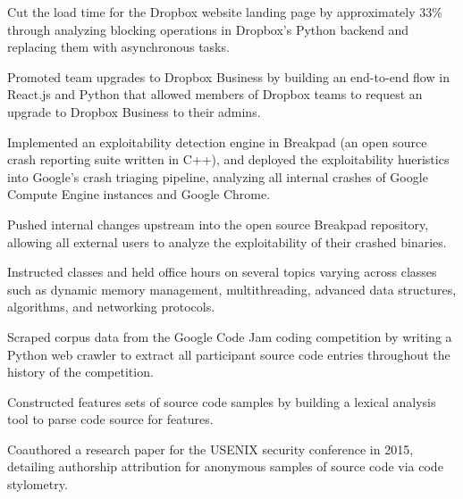 \documentclass[]{template}
\begin{document}
\begin{tightemize}
\item
  Cut the load time for the Dropbox website landing page by approximately 33\%
  through analyzing blocking operations in Dropbox's Python backend and
  replacing them with asynchronous tasks.
\item
  Promoted team upgrades to Dropbox Business by building an end-to-end flow in
  React.js and Python that allowed members of Dropbox teams to request an
  upgrade to Dropbox Business to their admins.
\end{tightemize}
\sectionsep

\begin{tightemize}
\item
  Implemented an exploitability detection engine in Breakpad (an open source
  crash reporting suite written in C++), and deployed the exploitability
  hueristics into Google's crash triaging pipeline, analyzing all internal
  crashes of Google Compute Engine instances and Google Chrome.
\item
  Pushed internal changes upstream into the open source Breakpad repository,
  allowing all external users to analyze the exploitability of their crashed
  binaries.
\end{tightemize}
\sectionsep

\begin{tightemize}
\item
  Instructed classes and held office hours on several topics varying across
  classes such as dynamic memory management, multithreading, advanced data
  structures, algorithms, and networking protocols.
\end{tightemize}
\sectionsep

\begin{tightemize}
\item
  Scraped corpus data from the Google Code Jam coding competition by writing a
  Python web crawler to extract all participant source code entries throughout
  the history of the competition.
\item
  Constructed features sets of source code samples by building a lexical
  analysis tool to parse code source for features.
\item
  Coauthored a research paper for the USENIX security conference in 2015,
  detailing authorship attribution for anonymous samples of source code via code
  stylometry.
\end{tightemize}
\sectionsep
\end{document}
